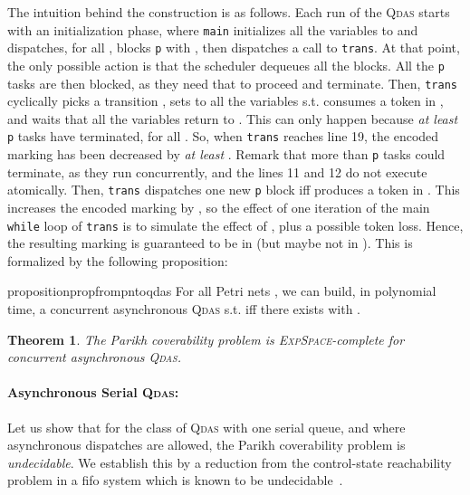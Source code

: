 \documentclass[runningheads,oribibl,]{article}
\newcommand{\qdas}{\textsc{Qdas}\xspace}
\newcommand{\fifo}{fifo\xspace}
\newcommand{\dexpspace}{\textsc{ExpSpace}\xspace}
\newtheorem{theorem}{Theorem}{}
\begin{document}
The intuition behind the construction is as follows. Each run of the
\qdas  starts with an initialization phase, where \texttt{main}
initializes all the  variables to  and dispatches, for all
,  blocks \texttt{p} with , then
dispatches a call to \texttt{trans}. At that point, the only possible
action is that the scheduler dequeues all the blocks. All the
\texttt{p} tasks are then blocked, as they need that  to
proceed and terminate. Then, \texttt{trans} cyclically picks a
transition , sets to  all the variables  s.t.   consumes
a token in , and waits that all the  variables return to
. This can only happen because \emph{at least}  \texttt{p}
tasks have terminated, for all . So, when \texttt{trans}
reaches line 19, the encoded marking has been decreased by \emph{at
  least} . Remark that more than  \texttt{p} tasks could
terminate, as they run concurrently, and the lines 11 and 12 do not
execute atomically. Then, \texttt{trans} dispatches one new \texttt{p}
block iff  produces a token in . This increases the encoded
marking by , so the effect of one iteration of the main
\texttt{while} loop of \texttt{trans} is to simulate the effect of
, plus a possible token loss. Hence, the resulting marking is
guaranteed to be in  (but maybe not in ). This
is formalized by the following proposition:

\begin{restatable}{proposition}{propfrompntoqdas}\label{prop:from-pn-to-qdas}
  For all Petri nets  , we can build, in polynomial time, a concurrent
  asynchronous \qdas  s.t.   iff there
  exists  with .
\end{restatable}

\begin{theorem}\label{thm:concasyncqdas}
  The Parikh coverability problem
  is \dexpspace-complete for concurrent asynchronous \qdas.
\end{theorem}

\paragraph{\bf Asynchronous Serial \qdas:}

Let us show that for the class
of \qdas with one serial queue, and where asynchronous dispatches are
allowed, the Parikh coverability problem is \emph{undecidable}. We
establish this by a reduction from the control-state  reachability
problem in a \fifo system which is known to be
undecidable~\cite{brand-d-1983-323-a}.
\end{document}
